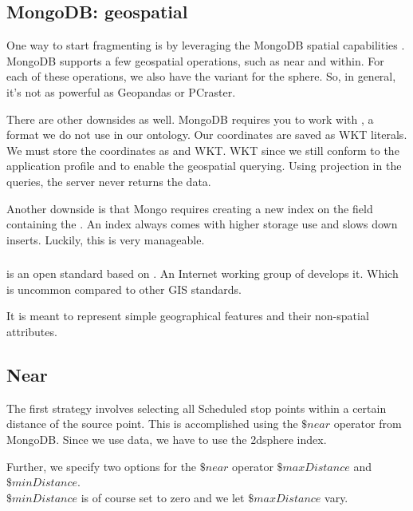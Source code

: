 \subsection{MongoDB: geospatial}
One way to start fragmenting is by leveraging the MongoDB spatial capabilities \cite{noauthor_geospatial_nodate}. MongoDB supports a few geospatial operations, such as near and within. For each of these operations, we also have the variant for the sphere. So, in general, it's not as powerful as Geopandas or PCraster. 

There are other downsides as well. MongoDB requires you to work with , a format we do not use in our ontology. Our coordinates are saved as WKT literals. We must store the coordinates as  and WKT. WKT since we still conform to the application profile and  to enable the geospatial querying. Using projection in the queries, the server never returns the  data. 

Another downside is that Mongo requires creating a new index on the field containing the . An index always comes with higher storage use and slows down inserts. Luckily, this is very manageable.

\subsubsection{}
 \cite{butler_geojson_2016} is an open standard based on . An Internet working group of  develops it. Which is uncommon compared to other GIS standards. 

It is meant to represent simple geographical features and their non-spatial attributes. 

\subsection{Near}
The first strategy involves selecting all Scheduled stop points within a certain distance of the source point. This is accomplished using the $\$near$ operator\cite{noauthor_near_nodate} from MongoDB. Since we use  data, we have to use the 2dsphere index. 

Further, we specify two options for the $\$near$ operator $\$maxDistance$ and $\$minDistance$.\\ $\$minDistance$ is of course set to zero and we let $\$maxDistance$ vary. 

